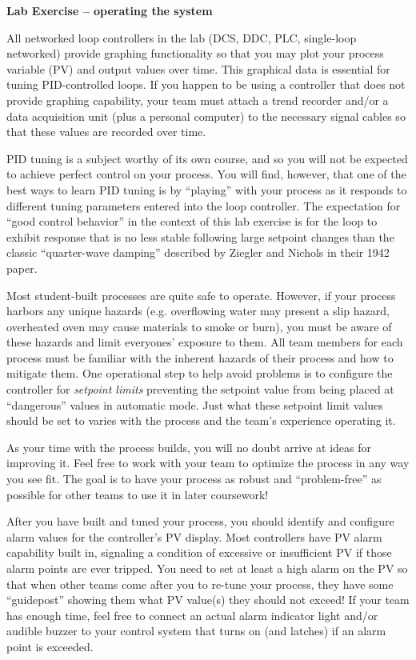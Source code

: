 \vfil \eject

\noindent
{\bf Lab Exercise -- operating the system}

\vskip 5pt

All networked loop controllers in the lab (DCS, DDC, PLC, single-loop networked) provide graphing functionality so that you may plot your process variable (PV) and output values over time.  This graphical data is essential for tuning PID-controlled loops.  If you happen to be using a controller that does not provide graphing capability, your team must attach a trend recorder and/or a data acquisition unit (plus a personal computer) to the necessary signal cables so that these values are recorded over time.

PID tuning is a subject worthy of its own course, and so you will not be expected to achieve perfect control on your process.  You will find, however, that one of the best ways to learn PID tuning is by ``playing'' with your process as it responds to different tuning parameters entered into the loop controller.  The expectation for ``good control behavior'' in the context of this lab exercise is for the loop to exhibit response that is no less stable following large setpoint changes than the classic ``quarter-wave damping'' described by Ziegler and Nichols in their 1942 paper.

\vskip 10pt

Most student-built processes are quite safe to operate.  However, if your process harbors any unique hazards (e.g. overflowing water may present a slip hazard, overheated oven may cause materials to smoke or burn), you must be aware of these hazards and limit everyones' exposure to them.  All team members for each process must be familiar with the inherent hazards of their process and how to mitigate them.  One operational step to help avoid problems is to configure the controller for {\it setpoint limits} preventing the setpoint value from being placed at ``dangerous'' values in automatic mode.  Just what these setpoint limit values should be set to varies with the process and the team's experience operating it.

As your time with the process builds, you will no doubt arrive at ideas for improving it.  Feel free to work with your team to optimize the process in any way you see fit.  The goal is to have your process as robust and ``problem-free'' as possible for other teams to use it in later coursework!

\vskip 10pt

After you have built and tuned your process, you should identify and configure alarm values for the controller's PV display.  Most controllers have PV alarm capability built in, signaling a condition of excessive or insufficient PV if those alarm points are ever tripped.  You need to set at least a high alarm on the PV so that when other teams come after you to re-tune your process, they have some ``guidepost'' showing them what PV value(s) they should not exceed!  If your team has enough time, feel free to connect an actual alarm indicator light and/or audible buzzer to your control system that turns on (and latches) if an alarm point is exceeded.

